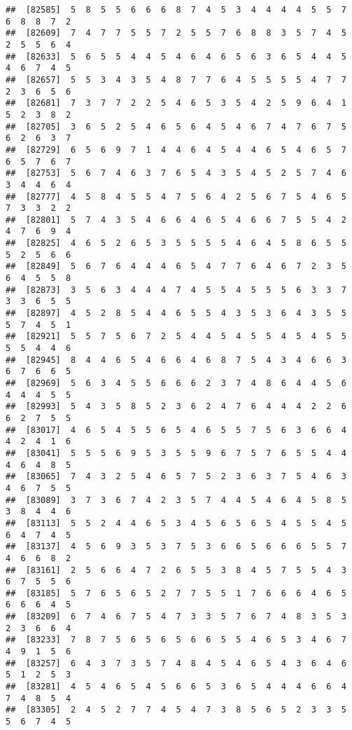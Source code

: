 \documentclass[
]{book}
\begin{document}
\begin{verbatim}
##  [82585]  5  8  5  5  6  6  6  8  7  4  5  3  4  4  4  4  5  5  7  6  8  8  7  2
##  [82609]  7  4  7  7  5  5  7  2  5  5  7  6  8  8  3  5  7  4  5  2  5  5  6  4
##  [82633]  5  6  5  5  4  4  5  4  6  4  6  5  6  3  6  5  4  4  5  4  6  7  4  5
##  [82657]  5  5  3  4  3  5  4  8  7  7  6  4  5  5  5  5  4  7  7  2  3  6  5  6
##  [82681]  7  3  7  7  2  2  5  4  6  5  3  5  4  2  5  9  6  4  1  5  2  3  8  2
##  [82705]  3  6  5  2  5  4  6  5  6  4  5  4  6  7  4  7  6  7  5  6  2  6  3  7
##  [82729]  6  5  6  9  7  1  4  4  6  4  5  4  4  6  5  4  6  5  7  6  5  7  6  7
##  [82753]  5  6  7  4  6  3  7  6  5  4  3  5  4  5  2  5  7  4  6  3  4  4  6  4
##  [82777]  4  5  8  4  5  5  4  7  5  6  4  2  5  6  7  5  4  6  5  7  3  3  2  2
##  [82801]  5  7  4  3  5  4  6  6  4  6  5  4  6  6  7  5  5  4  2  4  7  6  9  4
##  [82825]  4  6  5  2  6  5  3  5  5  5  5  4  6  4  5  8  6  5  5  5  2  5  6  6
##  [82849]  5  6  7  6  4  4  4  6  5  4  7  7  6  4  6  7  2  3  5  6  4  5  5  8
##  [82873]  3  5  6  3  4  4  4  7  4  5  5  4  5  5  5  6  3  3  7  3  3  6  5  5
##  [82897]  4  5  2  8  5  4  4  6  5  5  4  3  5  3  6  4  3  5  5  5  7  4  5  1
##  [82921]  5  5  7  5  6  7  2  5  4  4  5  4  5  5  4  5  4  5  5  5  5  4  4  6
##  [82945]  8  4  4  6  5  4  6  6  4  6  8  7  5  4  3  4  6  6  3  6  7  6  6  5
##  [82969]  5  6  3  4  5  5  6  6  6  2  3  7  4  8  6  4  4  5  6  4  4  4  5  5
##  [82993]  5  4  3  5  8  5  2  3  6  2  4  7  6  4  4  4  2  2  6  6  2  7  5  5
##  [83017]  4  6  5  4  5  5  6  5  4  6  5  5  7  5  6  3  6  6  4  4  2  4  1  6
##  [83041]  5  5  5  6  9  5  3  5  5  9  6  7  5  7  6  5  5  4  4  4  6  4  8  5
##  [83065]  7  4  3  2  5  4  6  5  7  5  2  3  6  3  7  5  4  6  3  4  6  7  5  5
##  [83089]  3  7  3  6  7  4  2  3  5  7  4  4  5  4  6  4  5  8  5  3  8  4  4  6
##  [83113]  5  5  2  4  4  6  5  3  4  5  6  5  6  5  4  5  5  4  5  6  4  7  4  5
##  [83137]  4  5  6  9  3  5  3  7  5  3  6  6  5  6  6  6  5  5  7  4  6  6  8  2
##  [83161]  2  5  6  6  4  7  2  6  5  5  3  8  4  5  7  5  5  4  3  6  7  5  5  6
##  [83185]  5  7  6  5  6  5  2  7  7  5  5  1  7  6  6  6  4  6  5  6  6  6  4  5
##  [83209]  6  7  4  6  7  5  4  7  3  3  5  7  6  7  4  8  3  5  3  2  3  6  6  4
##  [83233]  7  8  7  5  6  5  6  5  6  6  5  5  4  6  5  3  4  6  7  4  9  1  5  6
##  [83257]  6  4  3  7  3  5  7  4  8  4  5  4  6  5  4  3  6  4  6  5  1  2  5  3
##  [83281]  4  5  4  6  5  4  5  6  6  5  3  6  5  4  4  4  6  6  4  7  4  8  5  4
##  [83305]  2  4  5  2  7  7  4  5  4  7  3  8  5  6  5  2  3  3  5  5  6  7  4  5

\end{verbatim}
\end{document}
